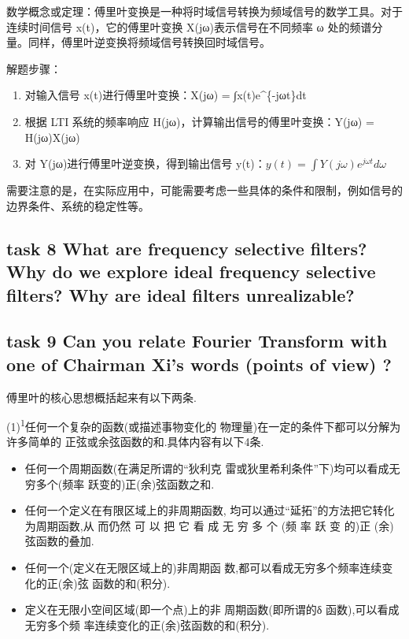 \documentclass[
]{article}
\begin{document}
数学概念或定理：傅里叶变换是一种将时域信号转换为频域信号的数学工具。对于连续时间信号
x(t)，它的傅里叶变换 X(jω)表示信号在不同频率 ω
处的频谱分量。同样，傅里叶逆变换将频域信号转换回时域信号。

解题步骤：

\begin{enumerate}
\def\labelenumi{\arabic{enumi}.}
\item
  对输入信号 x(t)进行傅里叶变换：X(jω) = ∫x(t)e\^{}\{-jωt\}dt
\item
  根据 LTI 系统的频率响应 H(jω)，计算输出信号的傅里叶变换：Y(jω) =
  H(jω)X(jω)
\item
  对 Y(jω)进行傅里叶逆变换，得到输出信号
  y(t)：\(y(t) = \int Y(j\omega)e^{j\omega t}d\omega\)
\end{enumerate}

需要注意的是，在实际应用中，可能需要考虑一些具体的条件和限制，例如信号的边界条件、系统的稳定性等。

\subsection{task 8 What are frequency selective filters? Why do we
explore ideal frequency selective filters? Why are ideal filters
unrealizable?}\label{task-8-what-are-frequency-selective-filters-why-do-we-explore-ideal-frequency-selective-filters-why-are-ideal-filters-unrealizable}

\subsection{task 9 Can you relate Fourier Transform with one of Chairman
Xi's words (points of view)
?}\label{task-9-can-you-relate-fourier-transform-with-one-of-chairman-xis-words-points-of-view-}

傅里叶的核心思想概括起来有以下两条.

(1)\textsuperscript{1}任何一个复杂的函数(或描述事物变化的
物理量)在一定的条件下都可以分解为许多简单的
正弦或余弦函数的和.具体内容有以下4条.

\begin{itemize}
\item
  任何一个周期函数(在满足所谓的``狄利克
  雷或狄里希利条件''下)均可以看成无穷多个(频率 跃变的)正(余)弦函数之和.
\item
  任何一个定义在有限区域上的非周期函数,
  均可以通过``延拓''的方法把它转化为周期函数,从 而仍然 可 以 把 它 看 成
  无 穷 多 个 (频 率 跃 变 的)正 (余)弦函数的叠加.
\item
  任何一个(定义在无限区域上的)非周期函
  数,都可以看成无穷多个频率连续变化的正(余)弦 函数的和(积分).
\item
  定义在无限小空间区域(即一个点)上的非 周期函数(即所谓的δ
  函数),可以看成无穷多个频 率连续变化的正(余)弦函数的和(积分).
\end{itemize}
\end{document}
